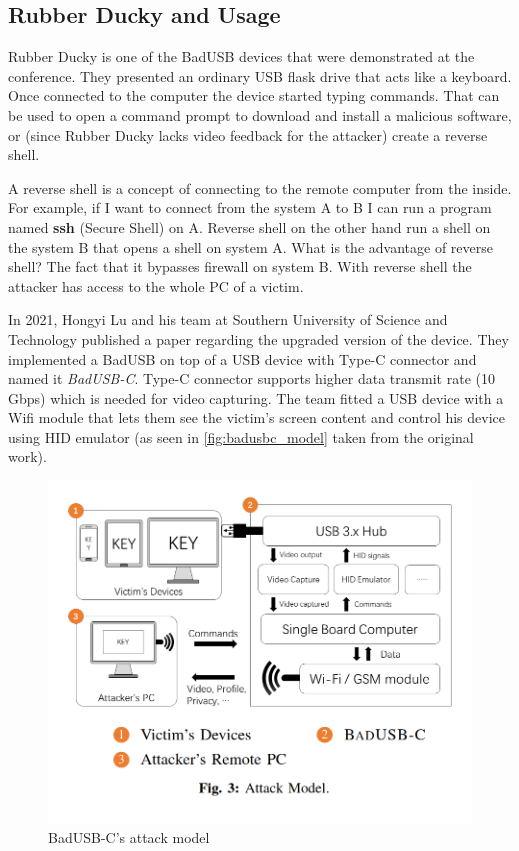 
\subsection*{Rubber Ducky and Usage}
\label{rubber_ducky}
Rubber Ducky is one of the BadUSB devices that were demonstrated at the conference. They presented an ordinary USB flask drive that acts like a keyboard. Once connected to the computer the device started typing commands. That can be used to open a command prompt to download and install a malicious software, or (since Rubber Ducky lacks video feedback for the attacker) create a reverse shell.

A reverse shell is a concept of connecting to the remote computer from the inside. For example, if I want to connect from the system A to B I can run a program named \textbf{ssh} (Secure Shell) on A. Reverse shell on the other hand run a shell on the system B that opens a shell on system A. What is the advantage of reverse shell? The fact that it bypasses firewall on system B. With reverse shell the attacker has access to the whole PC of a victim.

In 2021, Hongyi Lu and his team at Southern University of Science and Technology published a paper regarding the upgraded version of the device. They implemented a BadUSB on top of a USB device with Type-C connector and named it \emph{BadUSB-C}. Type-C connector supports higher data transmit rate (10 Gbps) which is needed for video capturing. The team fitted a USB device with a Wifi module that lets them see the victim's screen content and control his device using HID emulator (as seen in \autoref{fig:badusbc_model} taken from the original work)\cite{badusbc}.

\begin{figure}[ht]
    \centering
    \includegraphics[width=\linewidth]{obrazky-figures/badusbc_attack.png}
    \caption{BadUSB-C's attack model}
    \label{fig:badusbc_model}
\end{figure}


